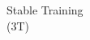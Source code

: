 \documentclass[preview]{standalone}
\begin{document}
\begin{center}
Stable Training\\(3T)
\end{center}
\end{document}
